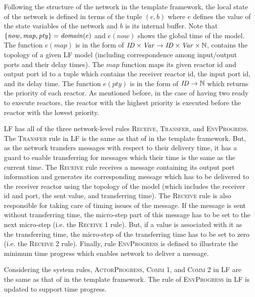 Following the structure of the network in the template framework, the local state of the network is defined in terms of the tuple $(e,b)$ where $e$ defines the value of the state variables of the network and $b$ is its internal buffer. Note that $\{\mathit{now, map, pty}\}=\mathit{domain}(e)$ and $e(\mathit{now})$ shows the global time of the model. The function $e(\mathit{map})$ is in the form of $\mathit{ID} \times \mathit{Var} \rightarrow \mathit{ID} \times \mathit{Var} \times \mathbb{N}$, contains the topology of a given LF model (including correspondence among input/output ports and their delay times). The $map$ function maps its given reactor id and output port id to a tuple which contains the receiver reactor id, the input port id, and its delay time. The function $e(\mathit{pty})$ is in the form of $\mathit{ID} \rightarrow \mathbb{N}$ which returns the priority of each reactor. As mentioned before, in the case of having two ready to execute reactors, the reactor with the highest priority is executed before the reactor with the lowest priority. 

LF has all of the three network-level rules \textsc{Receive}, \textsc{Transfer}, and \textsc{EnvProgress}. The \textsc{Transfer} rule in LF is the same as that of in the template framework. But, as the network transfers messages with respect to their delivery time, it has a guard to enable transferring for messages which their time is the same as the current time. The \textsc{Receive} rule receives a message containing its output port information and generates its corresponding message which has to be delivered to the receiver reactor using the topology of the model (which includes the receiver id and port, the sent value, and transferring time). The \textsc{Receive} rule is also responsible for taking care of timing issues of the message. If the message is sent without transferring time, the micro-step part of this message has to be set to the next micro-step (i.e. the \textsc{Receive 1} rule). But, if a value is associated with it as the transferring time, the micro-step of the transferring time has to be set to zero (i.e. the \textsc{Receive 2} rule). Finally, rule \textsc{EnvProgress} is defined to illustrate the minimum time progress which enables network to deliver a message.

Considering the system rules, \textsc{ActorProgress}, \textsc{Comm 1}, and \textsc{Comm 2} in LF are the same as that of in the template framework. The rule of \textsc{EnvProgress} in LF is updated to support time progress.


